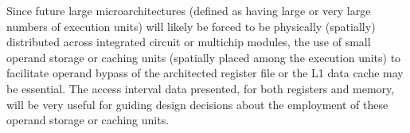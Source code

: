 \documentclass[10pt,dvips]{article}
\begin{document}
Since future large microarchitectures (defined as having
large or very large numbers of execution units) will likely be
forced to be physically (spatially) distributed across
integrated circuit or multichip modules, the use of small
operand storage or caching units 
(spatially placed among the execution units)
to facilitate operand bypass
of the architected register file or the L1 data cache may be
essential.
The access interval data presented, for both registers and memory,
will be very useful for guiding design decisions about
the employment of these operand storage or caching units.
%


%
\end{document}
